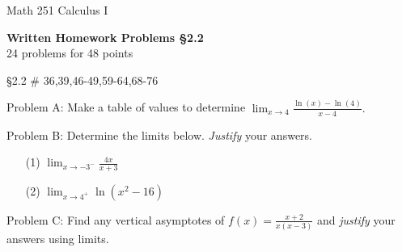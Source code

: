 \documentclass[11pt]{report}
\theoremstyle{plain}
\begin{document}
\hfill Math 251 Calculus I
\begin{center}
\Large{\textbf{Written Homework Problems \S 2.2}} \\
24 problems for 48 points\\
\end{center}
\begin{description}
\item{\S 2.2} \# 36,39,46-49,59-64,68-76 \\

\item Problem A: Make a table of values to determine $\displaystyle \lim_{x \to 4} \frac{\ln(x)-\ln(4)}{x-4}.$

\item Problem B: Determine the limits below. \emph{Justify} your answers.\\
\begin{enumerate}
\item[(1)] $\displaystyle{\lim_{x \to -3^-}\frac{4x}{x+3}}$
\item[(2)] $\displaystyle{\lim_{x \to 4^+} \ln(x^2-16)}$
\end{enumerate}
\item Problem C: Find any vertical asymptotes of $\displaystyle f(x)=\frac{x+2}{x(x-3)}$ and \emph{justify} your answers using limits.

\end{description}
\end{document}
